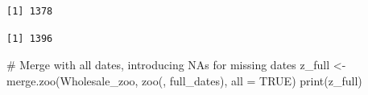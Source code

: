 \documentclass[
  letterpaper,
  DIV=11,
  numbers=noendperiod]{scrartcl}
\newenvironment{Shaded}{\begin{snugshade}}{\end{snugshade}}
\newcommand{\AttributeTok}[1]{\textcolor[rgb]{0.40,0.45,0.13}{#1}}
\newcommand{\CommentTok}[1]{\textcolor[rgb]{0.37,0.37,0.37}{#1}}
\newcommand{\ConstantTok}[1]{\textcolor[rgb]{0.56,0.35,0.01}{#1}}
\newcommand{\FunctionTok}[1]{\textcolor[rgb]{0.28,0.35,0.67}{#1}}
\newcommand{\NormalTok}[1]{\textcolor[rgb]{0.00,0.23,0.31}{#1}}
\newcommand{\OtherTok}[1]{\textcolor[rgb]{0.00,0.23,0.31}{#1}}
\newcommand{\SpecialCharTok}[1]{\textcolor[rgb]{0.37,0.37,0.37}{#1}}
\newcommand{\StringTok}[1]{\textcolor[rgb]{0.13,0.47,0.30}{#1}}
\begin{document}
\begin{verbatim}
[1] 1378
\end{verbatim}

\begin{Shaded}
\end{Shaded}

\begin{verbatim}
[1] 1396
\end{verbatim}

\begin{Shaded}
\begin{Highlighting}[]
\CommentTok{\# Merge with all dates, introducing NAs for missing dates}
\NormalTok{z\_full }\OtherTok{\textless{}{-}} \FunctionTok{merge.zoo}\NormalTok{(Wholesale\_zoo, }\FunctionTok{zoo}\NormalTok{(, full\_dates), }\AttributeTok{all =} \ConstantTok{TRUE}\NormalTok{)}
\FunctionTok{print}\NormalTok{(z\_full)}
\end{Highlighting}
\end{Shaded}
\end{document}
